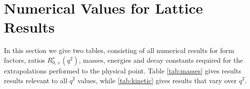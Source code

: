 \section{Numerical Values for Lattice Results}
\label{sec:tables}

In this section we give two tables, consisting of all numerical results for form factors, ratios $R_{0,+}^s(q^2)$, masses, energies and decay constants required for the extrapolations performed to the physical point. Table \ref{tab:masses} gives results results relevant to all $q^2$ values, while \ref{tab:kinetic} gives results that vary over $q^2$.


